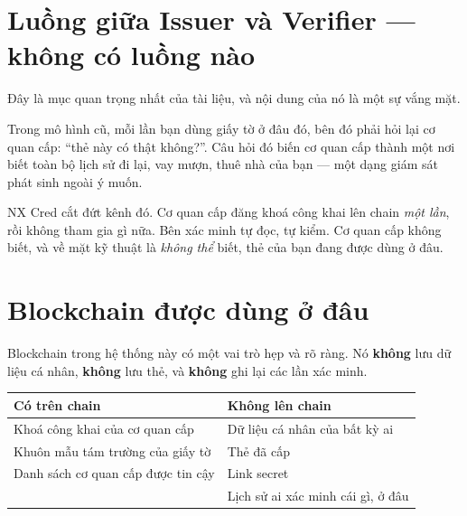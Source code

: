 \documentclass[a4paper,11pt]{article}
\begin{document}
\section{Luồng giữa Issuer và Verifier --- không có luồng nào}
\label{sec:flow-iv}

Đây là mục quan trọng nhất của tài liệu, và nội dung của nó là một sự vắng mặt.

\begin{center}
\end{center}

Trong mô hình cũ, mỗi lần bạn dùng giấy tờ ở đâu đó, bên đó phải hỏi lại cơ quan cấp:
``thẻ này có thật không?''. Câu hỏi đó biến cơ quan cấp thành một nơi biết toàn bộ lịch sử
đi lại, vay mượn, thuê nhà của bạn --- một dạng giám sát phát sinh ngoài ý muốn.

NX Cred cắt đứt kênh đó. Cơ quan cấp đăng khoá công khai lên chain \emph{một lần}, rồi
không tham gia gì nữa. Bên xác minh tự đọc, tự kiểm. Cơ quan cấp không biết, và về mặt kỹ
thuật là \emph{không thể} biết, thẻ của bạn đang được dùng ở đâu.

\section{Blockchain được dùng ở đâu}

Blockchain trong hệ thống này có một vai trò hẹp và rõ ràng. Nó \textbf{không} lưu dữ liệu
cá nhân, \textbf{không} lưu thẻ, và \textbf{không} ghi lại các lần xác minh.

\begin{center}
\begin{tabular}{@{}p{6.6cm}p{7.4cm}@{}}
\toprule
\textbf{\sffamily Có trên chain} & \textbf{\sffamily Không lên chain} \\
\midrule
Khoá công khai của cơ quan cấp & Dữ liệu cá nhân của bất kỳ ai \\
Khuôn mẫu tám trường của giấy tờ & Thẻ đã cấp \\
Danh sách cơ quan cấp được tin cậy & Link secret \\
 & Lịch sử ai xác minh cái gì, ở đâu \\
\bottomrule
\end{tabular}
\end{center}
\end{document}
